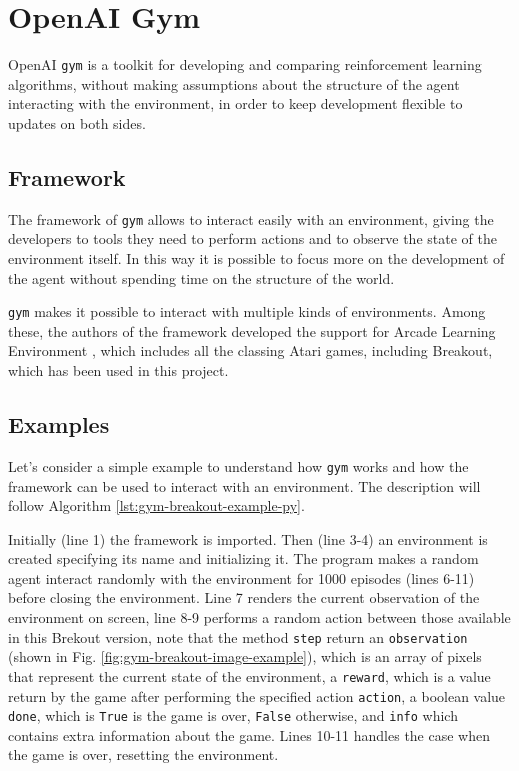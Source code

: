 \section{OpenAI Gym}
OpenAI \texttt{gym} \cite{1606.01540} is a toolkit for developing and comparing
reinforcement learning algorithms, without making assumptions about the
structure of the agent interacting with the environment, in order to
keep development flexible to updates on both sides.

\subsection{Framework}
The framework of \texttt{gym} allows to interact easily
with an environment, giving the developers to tools they need to perform
actions and to observe the state of the environment itself. In this way it is
possible to focus more on the development of the agent without spending
time on the structure of the world.

\texttt{gym} makes it possible to interact with multiple kinds of environments.
Among these, the authors of the framework developed the support for
Arcade Learning Environment \cite{bellemare13arcade}, which includes all the
classing Atari games, including Breakout, which has been used in this project.

\subsection{Examples}
Let's consider a simple example to understand how \texttt{gym} works and
how the framework can be used to interact with an environment.
The description will follow Algorithm \ref{lst:gym-breakout-example-py}.



Initially (line 1) the framework is imported. Then (line 3-4) an environment
is created specifying its name and initializing it. The program makes a
random agent interact randomly with the environment for 1000 episodes (lines
6-11) before closing the environment. Line 7 renders the current
observation of the environment on screen, line 8-9 performs a random action
between those available in this Brekout version, note that the method
\texttt{step} return an \texttt{observation} (shown in Fig.
\ref{fig:gym-breakout-image-example}), which is an array of pixels
that represent the current state of the environment, a \texttt{reward},
which is a value return by the game after performing the specified action
\texttt{action}, a boolean value \texttt{done}, which is \texttt{True} is
the game is over, \texttt{False} otherwise, and \texttt{info} which contains
extra information about the game. Lines 10-11 handles the case when the game
is over, resetting the environment.

